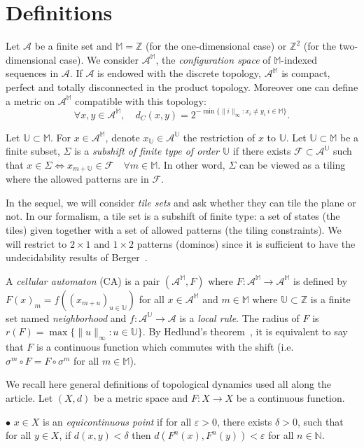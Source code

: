 \documentclass{llncs}
\renewcommand{\epsilon}{\varepsilon}
\newcommand{\dc}{d_C}
\newcommand{\N}{\mathbb{N}}
\newcommand{\Z}{\mathbb{Z}}
\newcommand{\M}{\mathbb{M}}
\newcommand{\U}{\mathbb{U}}
\newcommand{\A}{\mathcal{A}}
\newcommand{\am}{\mathcal{A}^{\mathbb{M}}}
\newcommand{\s}{\sigma}
\newcommand{\dd}{\delta}
\newcommand{\e}{\epsilon}
\newcommand{\gs}{\Sigma}
\begin{document}
\section{Definitions}

Let $\A$ be a finite set and $\M=\Z$ (for the one-dimensional case) or
$\Z^2$ (for the two-dimensional case). We consider $\am$, the {\em
  configuration space} of $\M$-indexed sequences in $\A$. If $\A$ is
endowed with the discrete topology, $\am$ is compact, perfect and
totally disconnected in the product topology.  Moreover one can define
a metric on $\am$ compatible with this topology:
$$\forall x,y\in\am,\quad \dc(x,y)=2^{-\min\{\|i\|_\infty: x_i\ne y_i \ i\in\M \}}.$$

Let $\U\subset\M$. For $x\in\am$, denote $x_{\U}\in\A^{\U}$ the
restriction of $x$ to $\U$.  Let $\U\subset\M$ be a finite subset,
$\gs$ is a {\em subshift of finite type of order $\U$} if there exists
$\mathcal{F}\subset\A^{\U}$ such that $x\in\gs \Longleftrightarrow
x_{m+\U}\in\mathcal{F} \quad \forall m\in\M$. In other word, $\gs$ can
be viewed as a tiling where the allowed patterns are in $\mathcal{F}$.

In the sequel, we will consider \emph{tile sets} and ask whether they
can tile the plane or not. In our formalism, a tile set is a subshift
of finite type: a set of states (the tiles) given together with a set
of allowed patterns (the tiling constraints). We will restrict to
$2\times 1$ and $1\times 2$ patterns (dominos) since it is sufficient
to have the undecidability results of Berger~\cite{berger}.

A {\em cellular automaton} (CA) is a pair $(\am,F)$ where
$F:\am\to\am$ is defined by $F(x)_m=f((x_{m+u})_{u\in\U})$ for all
$x\in\am$ and $m\in\M$ where $\U\subset\Z$ is a finite set named {\em
  neighborhood} and $f:\A^{\U}\rightarrow\A$ is a {\em local
  rule}. The radius of $F$ is $r(F)=\max\{\|u\|_\infty:u\in\U\}$. By
Hedlund's theorem~\cite{hedlund}, it is equivalent to say that $F$ is
a continuous function which commutes with the shift (i.e. $\s^m\circ
F=F\circ\s^m$ for all $m\in\M$).

We recall here general definitions of topological dynamics used all
along the article. Let $(X,d)$ be a metric space and $F:X\to X$ be a
continuous function.


$\bullet$ $x\in X$ is an {\em equicontinuous point} if for all $\e>0$,
there exists $\dd>0$, such that for all $y\in X$, if $d(x,y)<\dd$ then
$d(F^n(x),F^n(y))<\e$ for all $n\in\N$.
\end{document}
